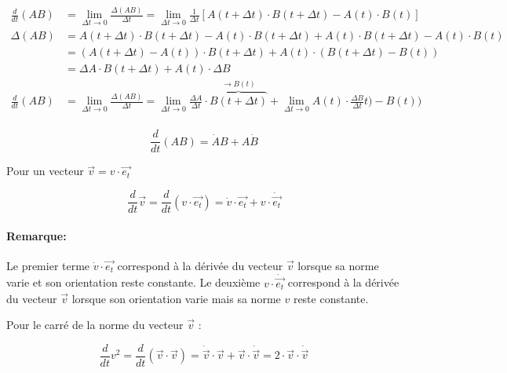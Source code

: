 \documentclass[
    11pt,
    a4paper,
    oneside,
    headinlcude, footinclude,
    twoside,
]{report}
\renewcommand{\vec}[1]{\overrightarrow{#1}}
\begin{document}
\[
    \begin{split}
        \frac{d}{dt} (AB) &= \lim_{\Delta t \to 0} \frac{\Delta (AB)}{\Delta t}
        = \lim_{\Delta t \to 0} \frac{1}{\Delta t} \left[A(t + \Delta t) \cdot
            B(t + \Delta t) - A(t) \cdot B(t)\right]\\
        \Delta (AB) &= A(t + \Delta t) \cdot B(t + \Delta t) - A(t) \cdot B(t +
        \Delta t) + A(t) \cdot B(t + \Delta t) - A(t) \cdot B(t) \\
        &=(A(t + \Delta t) - A(t)) \cdot B(t+\Delta t) + A(t) \cdot (B(t + \Delta t) - B(t))\\
        &= \Delta A \cdot B(t + \Delta t) + A(t) \cdot \Delta B\\
        \frac{d}{dt}(AB) &= \lim_{\Delta t \to 0} \frac{\Delta (AB)}{\Delta t} =
        \lim_{\Delta t \to 0} \frac{\Delta A}{\Delta t} \cdot \overbrace{B(t + \Delta t)}^{\to
        B(t)} + \lim_{\Delta t \to 0} A(t) \cdot \frac{\Delta B}{\Delta t} t) - B(t))\\
    \end{split}
\]

\begin{equation}
    \label{eq:3.47}
    \frac{d}{dt} (AB) = \dot A B + A \dot B 
\end{equation}

Pour un vecteur $\vec v = v \cdot \vec{e_{t}}$

\begin{equation}
    \label{eq:3.48}
    \frac{d}{dt} \vec v = \frac{d}{dt}(v \cdot \vec{e_{t}}) = \dot v \cdot \vec{e_{t}}
    + v\cdot \dot{\vec{e_{t}}}
\end{equation}

\paragraph{Remarque:}

Le premier terme $\dot v \cdot \vec{e_{t}}$ correspond à la dérivée du vecteur $\vec v$
lorsque sa norme varie et son orientation reste constante. Le deuxième $v \cdot
\dot{\vec{e_{t}}}$ correspond à la dérivée du vecteur $\vec v$ lorsque son
orientation varie mais sa norme $v$ reste constante.

Pour le carré de la norme du vecteur $\vec v$ :

\begin{equation}
    \label{eq:3.49}
    \frac{d}{dt} v^{2}  = \frac{d}{dt} (\vec v \cdot \vec v) = \dot{\vec v} \cdot
    \vec v + \vec v \cdot \dot{\vec v} = 2 \cdot \vec v \cdot \dot{\vec v}
\end{equation}
\end{document}
